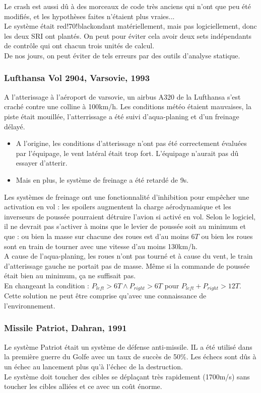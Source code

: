 \documentclass{cours}
\begin{document}
Le crash est aussi dû à des morceaux de code très anciens qui n'ont que peu été modifiés, et les hypothèses faites n'étaient plus vraies...\\
Le système était red!70!blackondant matériellement, mais pas logiciellement, donc les deux SRI ont plantés. On peut pour éviter cela avoir deux sets indépendants de contrôle qui ont chacun trois unités de calcul.\\
De nos jours, on peut éviter de tels erreurs par des outils d'analyse statique.

\subsubsection{Lufthansa Vol 2904, Varsovie, 1993}
A l'atterissage à l'aéroport de varsovie, un airbus A320 de la Lufthansa s'est craché contre une colline à 100km/h. Les conditions météo étaient mauvaises, la piste était mouillée, l'atterrissage a été suivi d'aqua-planing et d'un freinage délayé.
\begin{itemize}
    \item A l'origine, les conditions d'atterissage n'ont pas été correctement évaluées par l'équipage, le vent latéral était trop fort. L'équipage n'aurait pas dû essayer d'atterir.
    \item Mais en plus, le système de freinage a été retardé de 9s.
\end{itemize}
Les systèmes de freinage ont une fonctionnalité d'inhibition pour empêcher une activation en vol : les spoilers augmentent la charge aérodynamique et les inverseurs de poussée pourraient détruire l'avion si activé en vol.
Selon le logiciel, il ne devrait pas s'activer à moins que le levier de poussée soit au minimum et que : ou bien la masse sur chacune des roues est d'au moins $6T$ ou bien les roues sont en train de tourner avec une vitesse d'au moins 130km/h.\\

A cause de l'aqua-planing, les roues n'ont pas tourné et à cause du vent, le train d'atterissage gauche ne portait pas de masse. Même si la commande de poussée était bien au minimum, ça ne suffisait pas.\\
En changeant la condition : $P_{left} > 6T \land P_{right} > 6T$ pour $P_{left} + P_{right} > 12T$. Cette solution ne peut être comprise qu'avec une connaissance de l'environnement.

\subsubsection{Missile Patriot, Dahran, 1991}
Le système Patriot était un système de défense anti-missile. IL a été utilisé dans la première guerre du Golfe avec un taux de succès de 50\%. Les échecs sont dûs à un échec au lancement plus qu'à l'échec de la destruction.\\
Le système doit toucher des cibles se déplaçant très rapidement (1700m/s) sans toucher les cibles alliées et ce avec un coût énorme.
\end{document}
